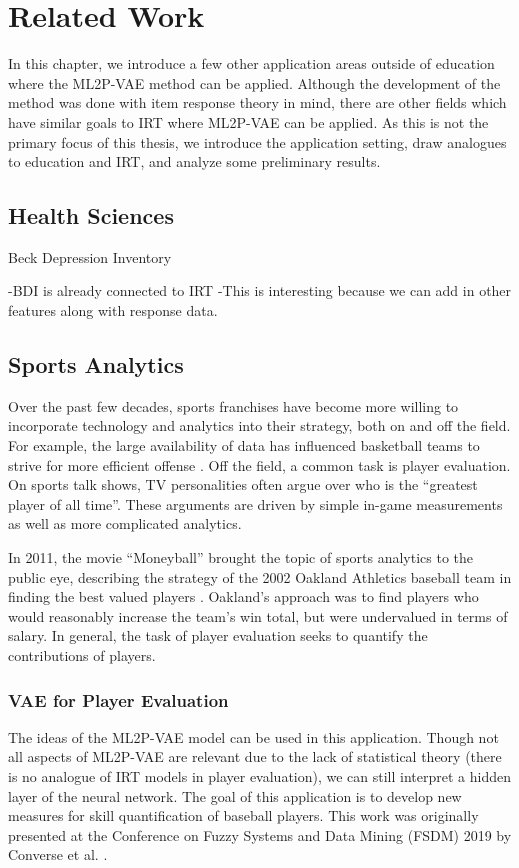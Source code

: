 \chapter{Related Work}\label{ch:related_work}

In this chapter, we introduce a few other application areas outside of education where the ML2P-VAE method can be applied. Although the development of the method was done with item response theory in mind, there are other fields which have similar goals to IRT where ML2P-VAE can be applied. As this is not the primary focus of this thesis, we introduce the application setting, draw analogues to education and IRT, and analyze some preliminary results.


\section{Health Sciences}
Beck Depression Inventory

-BDI is already connected to IRT
-This is interesting because we can add in other features along with response data.


\section{Sports Analytics}
Over the past few decades, sports franchises have become more willing to incorporate technology and analytics into their strategy, both on and off the field. For example, the large availability of data has influenced basketball teams to strive for more efficient offense . Off the field, a common task is player evaluation. On sports talk shows, TV personalities often argue over who is the ``greatest player of all time''. These arguments are driven by simple in-game measurements as well as more complicated analytics. 

In 2011, the movie ``Moneyball'' brought the topic of sports analytics to the public eye, describing the strategy of the 2002 Oakland Athletics baseball team in finding the best valued players . Oakland's approach was to find players who would reasonably increase the team's win total, but were undervalued in terms of salary. In general, the task of player evaluation seeks to quantify the contributions of players.

\subsection{VAE for Player Evaluation}
The ideas of the ML2P-VAE model can be used in this application. Though not all aspects of ML2P-VAE are relevant due to the lack of statistical theory (there is no analogue of IRT models in player evaluation), we can still interpret a hidden layer of the neural network. The goal of this application is to develop new measures for skill quantification of baseball players. This work was originally presented at the Conference on Fuzzy Systems and Data Mining (FSDM) 2019 by Converse et al. \cite{fsdm_paper}.

